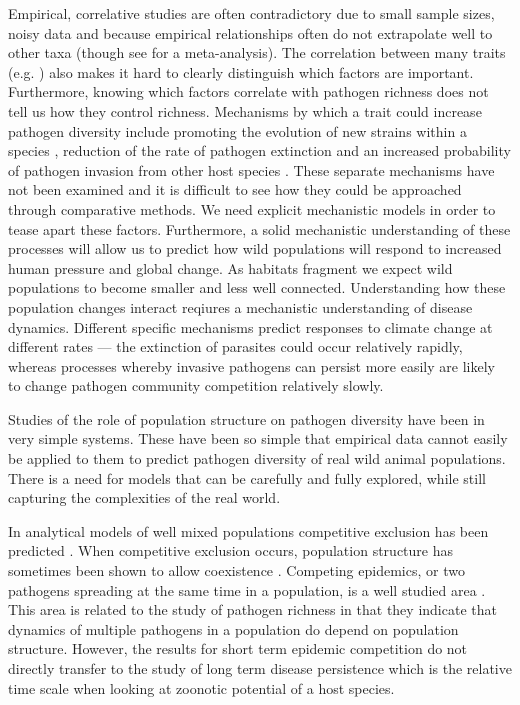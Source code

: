 Empirical, correlative studies are often contradictory due to small sample sizes, noisy data and because empirical relationships often do not extrapolate well to other taxa (though see \cite{kamiya2014determines} for a meta-analysis).
The correlation between many traits (e.g. \textcite{nunn2015infectious}) also makes it hard to clearly distinguish which factors are important.
Furthermore, knowing which factors correlate with pathogen richness does not tell us how they control richness. 
Mechanisms by which a trait could increase pathogen diversity include promoting the evolution of new strains within a species \cite{buckee2004effects}, reduction of the rate of pathogen extinction \cite{rand1995invasion} and an increased probability of pathogen invasion from other host species \cite{nunes2006localized}.
These separate mechanisms have not been examined and it is difficult to see how they could be approached through comparative methods.
We need explicit mechanistic models in order to tease apart these factors.
Furthermore, a solid mechanistic understanding of these processes will allow us to predict how wild populations will respond to increased human pressure and global change.
As habitats fragment we expect wild populations to become smaller and less well connected.
Understanding how these population changes interact reqiures a mechanistic understanding of disease dynamics.
Different specific mechanisms predict responses to climate change at different rates --- the extinction of parasites could occur relatively rapidly, whereas processes whereby invasive pathogens can persist more easily are likely to change pathogen community competition relatively slowly.




 

Studies of the role of population structure on pathogen diversity have been in very simple systems.
These have been so simple that empirical data cannot easily be applied to them to predict pathogen diversity of real wild animal populations.
There is a need for models that can be carefully and fully explored, while still capturing the complexities of the real world.

In analytical models of well mixed populations competitive exclusion has been predicted \cite{ackleh2003competitive, bremermann1989competitive, martcheva2013competitive, qiu2013vector, allen2004sis}.
When competitive exclusion occurs, population structure has sometimes been shown to allow coexistence \cite{qiu2013vector, allen2004sis, nunes2006localized}.
Competing epidemics, or two pathogens spreading at the same time in a population, is a well studied area \cite{poletto2013host, poletto2015characterising, karrer2011competing}. 
This area is related to the study of pathogen richness in that they indicate that dynamics of multiple pathogens in a population do depend on population structure.
However, the results for short term epidemic competition do not directly transfer to the study of long term disease persistence which is the relative time scale when looking at zoonotic potential of a host species.


